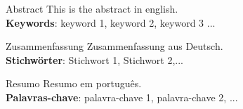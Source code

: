 \documentclass[a4paper]{apaThesis}
\begin{document}
\cleardoublepage



\begin{newabstract}{Abstract}
	This is the abstract in english. \\
\noindent
\textbf{Keywords}: keyword 1, keyword 2, keyword 3 ...
\end{newabstract}
\newpage

\begin{newabstract}{Zusammenfassung}
Zusammenfassung aus Deutsch. \\

\noindent
\textbf{Stichwörter}: Stichwort 1, Stichwort 2,...
\end{newabstract}
\newpage

\begin{newabstract}{Resumo}
	Resumo em português. \\
\noindent
\textbf{Palavras-chave}: palavra-chave 1, palavra-chave 2, ...
\end{newabstract}


\listoffigures
\cleardoublepage

\listoftables
\cleardoublepage

\end{document}
